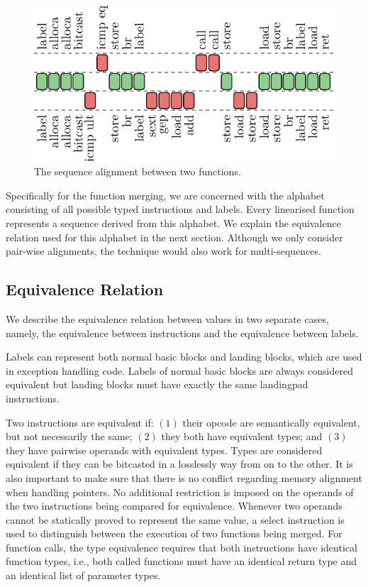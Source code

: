 \begin{figure}[h]
  \centering
  \includegraphics[width=0.85\linewidth]{src/merge-operation/figs/opcode-align.pdf}
  \caption{The sequence alignment between two functions.}
  \label{fig:opcode-align}
\end{figure}

Specifically for the function merging, we are concerned with the alphabet consisting of all possible typed instructions and labels.
Every linearised function represents a sequence derived from this alphabet.
We explain the equivalence relation used for this alphabet in the next section.
Although we only consider pair-wise alignments, the technique would also work for multi-sequences.

\subsection{Equivalence Relation}

We describe the equivalence relation between values in two separate cases, namely, the equivalence between instructions and the equivalence between labels.

Labels can represent both normal basic blocks and landing blocks, which are used in exception handling code.
Labels of normal basic blocks are always considered equivalent but landing blocks must have exactly the same landingpad instructions.

Two instructions are equivalent if: $(1)$ their opcode are semantically
equivalent, but not necessarily the same; $(2)$ they both have equivalent types;
and $(3)$ they have pairwise operands with equivalent types.
Types are considered equivalent if they can be bitcasted in a losslessly way
from on to the other.
It is also important to make sure that there is no conflict regarding memory
alignment when handling pointers.
No additional restriction is imposed on the operands of the two instructions
being compared for equivalence.
Whenever two operands cannot be statically proved to represent the same value,
a select instruction is used to distinguish between the execution of two
functions being merged.
For function calls, the type equivalence requires that both instructions have
identical function types, i.e., both called functions must have an identical
return type and an identical list of parameter types. 

